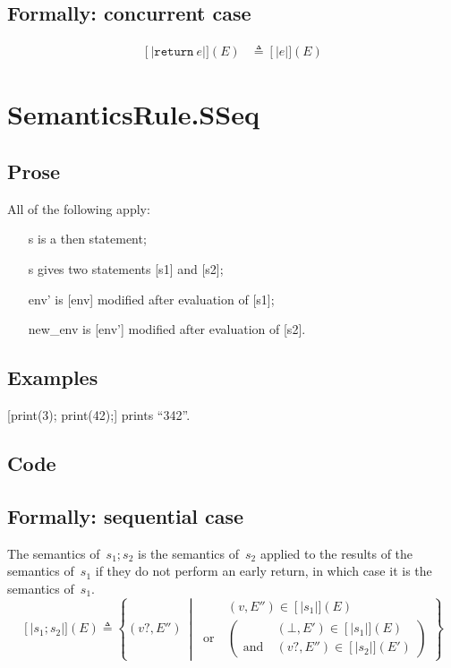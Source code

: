 \documentclass{book}
\newcommand\syntt[1]{\mathtt{#1}}
\newcommand\llbracket{[|}
\newcommand\rrbracket{|]}
\newcommand\interp[1]{\left\llbracket #1 \right\rrbracket}
\newcommand\st[0]{\ \middle|\ }
\begin{document}
  \subsection{Formally: concurrent case}
  \begin{align}
  \interp{\syntt{return}\ e} (E) & \triangleq \interp{e} (E)
  \label{eq:sem-conc-sreturn}
  \end{align} 

\section{SemanticsRule.SSeq \label{sec:SemanticsRule.SSeq}}

  \subsection{Prose}
  All of the following apply:
  \begin{itemize}
  \item [s] is a then statement;
  \item [s] gives two statements [s1] and [s2];
  \item [env'] is [env] modified after evaluation of [s1];
  \item [new\_env] is [env'] modified after evaluation of [s2].
  \end{itemize}

  \subsection{Examples}
  [print(3); print(42);] prints ``342''.

  \subsection{Code}

  \subsection{Formally: sequential case}
  The semantics of~$s_1; s_2$ is the semantics of~$s_2$ applied to the results
  of the semantics of~$s_1$ if they do not perform an early return, in which
  case it is the semantics of~$s_1$.
  \begin{equation}
    \interp{s_1; s_2} (E) \triangleq
      \left\{ (v?, E'') \st{}
      \begin{aligned}
        & (v, E'') \in \interp{s_1} (E)
        \\ \text{or}\ &
        \left(
        \begin{aligned}
            & (\bot{}, E') \in \interp{s_1} (E)
            \\ \text{and}\ &
            (v?, E'') \in \interp{s_2} (E')
        \end{aligned}
        \right)
      \end{aligned}
      \right\}
    \label{eq:sem-seq-sseq}
  \end{equation}
\end{document}
